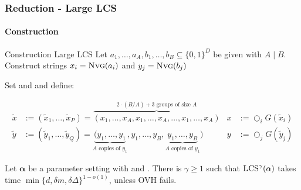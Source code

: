 \begin{frame}
\frametitle{Reduction - Large LCS}
\framesubtitle{Construction}


\begin{exampleblock}{Construction Large LCS}
Let  $a_1, \dots, a_A, b_1, \dots, b_B \subseteq \{0,1\}^D$ be given with $A \mid B$. 
Construct strings $x_i = \text{\textsc{Nvg}}(a_i)$ and $y_j = \text{\textsc{Nvg}}(b_j)$


Set  and  and define:
\vspace{-2ex}

\begin{align*}
\tilde{x} &:= (\tilde{x}_1, \ldots, \tilde{x}_P) = \overbrace{(x_1, \ldots, x_A, x_1, \ldots, x_A, \ldots, x_1, \ldots, x_A)}^{2 \cdot (B/A) + 3 \text{ groups of size } A} 	&	x &:= \bigcirc_i G(\tilde{x}_i)\\
%
\tilde{y} &:= (\tilde{y}_1, \ldots, \tilde{y}_Q) = \underbrace{(y_1, \ldots, y_1}_{A \text{ copies of } y_1}, y_1, \ldots, y_B, \underbrace{y_1, \ldots, y_B}_{A \text{ copies of } y_1})	&	y &:= \bigcirc_j G(\tilde{y}_j)
\end{align*}
\end{exampleblock}

%
%
%
%
%
%

\begin{theorem}
	Let $\mathbf{\alpha}$ be a parameter setting with  and . 
	There is $\gamma \geq 1$ such that $\text{LCS}^\gamma(\mathbf{\alpha})$ takes time $\min\{d, \delta m, \delta \Delta\}^{1 - o(1)}$, unless OVH fails.
\end{theorem}


\end{frame}
